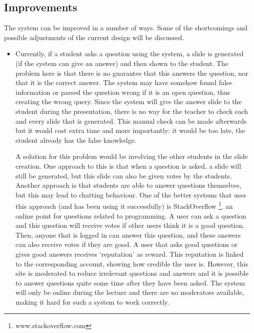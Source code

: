 \documentclass[11pt]{article}
\begin{document}
\subsection{Improvements}
The system can be improved in a number of ways. Some of the shortcomings and possible adjustments of the current design will be discussed. 
\begin{itemize}
\item Currently, if a student asks a question using the system, a slide is generated (if the system can give an answer) and then shown to the student. The problem here is that there is no guarantee that this answers the question, nor that it is the correct answer. The system may have somehow found false information or parsed the question wrong if it is an open question, thus creating the wrong query. Since the system will give the answer slide to the student during the presentation, there is no way for the teacher to check each and every slide that is generated. This manual check can be made afterwards but it would cost extra time and more importantly: it would be too late, the student already has the false knowledge. 

A solution for this problem would be involving the other students in the slide creation. One approach to this is that when a question is asked, a slide will still be generated, but this slide can also be given votes by the students. Another approach is that students are able to answer questions themselves, but this may lead to chatting behaviour. One of the better systems that uses this approach (and has been using it successfully) is StackOverflow \footnote{www.stackoverflow.com}, an online point for questions related to programming. A user can ask a question and this question will receive votes if other users think it is a good question. Then, anyone that is logged in can answer this question, and these answers can also receive votes if they are good. A user that asks good questions or gives good answers receives `reputation' as reward. This reputation is linked to the corresponding account, showing how credible the user is. However, this site is moderated to reduce irrelevant questions and answers and it is possible to answer questions quite some time after they have been asked. The system will only be online during the lecture and there are no moderators available, making it hard for such a system to work correctly. 


\end{itemize}
\end{document}
